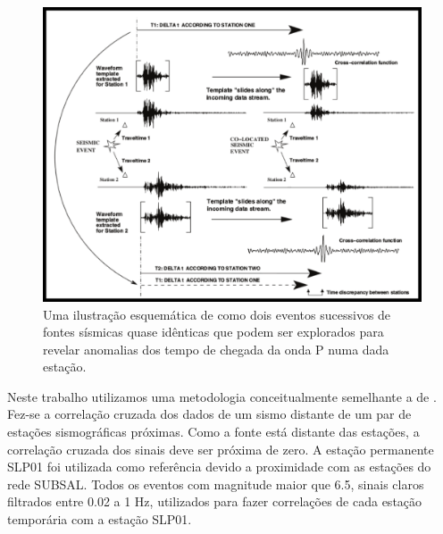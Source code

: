 \begin{figure}[!ht]
\centering
\includegraphics[scale=0.6]{Figs/correlacao_tempo_de_chegada.png}
\caption[Uma ilustração esquemática mostrando a correlação dos tempos de chegada da onda P.]{Uma ilustração esquemática de como dois eventos sucessivos de fontes sísmicas quase idênticas que podem ser explorados para revelar anomalias dos tempo de chegada da onda P numa dada estação. \cite{gibbons_identification_2006}}
\label{teste_tempo}
\end{figure}

Neste trabalho utilizamos uma metodologia conceitualmente semelhante a de \cite{gibbons_identification_2006}. Fez-se a correlação cruzada dos dados de um sismo distante de um par de estações sismográficas próximas. Como a fonte está distante das estações, a correlação cruzada dos sinais deve ser próxima de zero. A estação permanente SLP01 foi utilizada como referência devido a proximidade com as estações do rede SUBSAL. Todos os eventos com magnitude maior que 6.5, sinais claros filtrados entre 0.02 a 1 Hz, utilizados para fazer correlações de cada estação temporária com a estação SLP01.


